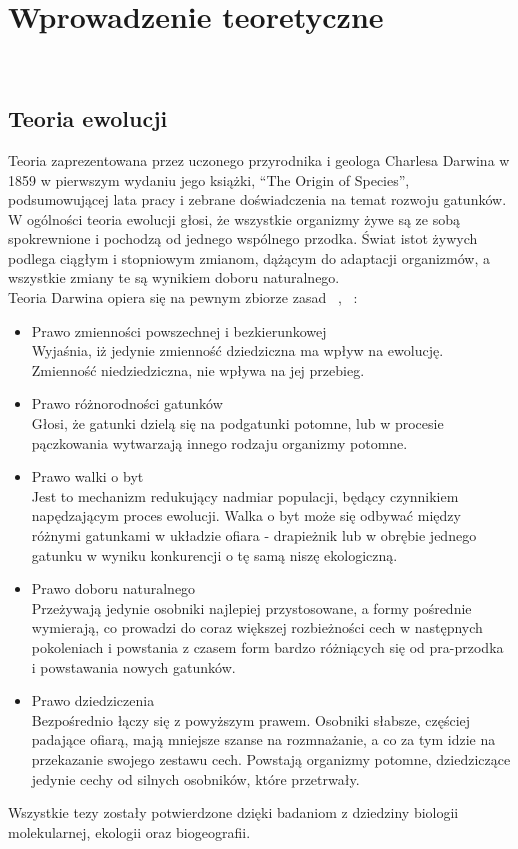 \documentclass[twoside,a4paper,10]{book}
\begin{document}
\chapter{Wprowadzenie teoretyczne} ~\label{sec:chap1} 

\section{ Teoria ewolucji}
Teoria zaprezentowana przez uczonego przyrodnika i geologa Charlesa Darwina w 1859 w pierwszym wydaniu jego książki, “The Origin of Species”,  podsumowującej lata pracy i zebrane doświadczenia na temat rozwoju gatunków. 
W ogólności teoria ewolucji głosi, że wszystkie organizmy żywe są ze sobą spokrewnione i pochodzą od jednego wspólnego przodka. Świat istot żywych podlega ciągłym i stopniowym zmianom, dążącym do adaptacji organizmów, a wszystkie zmiany te są wynikiem doboru naturalnego.   ~\cite{darwin}
\\Teoria Darwina opiera się na pewnym zbiorze zasad  ~\cite{darwin},  ~\cite{darwinWeb}: 
\begin{itemize}
\item{   Prawo zmienności powszechnej i bezkierunkowej}\\
Wyjaśnia, iż jedynie zmienność dziedziczna ma wpływ na ewolucję. Zmienność niedziedziczna, nie wpływa na jej przebieg.
\item{  Prawo różnorodności gatunków}\\ Głosi, że gatunki dzielą się na podgatunki potomne, lub w procesie pączkowania wytwarzają innego rodzaju organizmy potomne.
\item{   Prawo walki o byt}\\ Jest to mechanizm redukujący nadmiar populacji, będący czynnikiem napędzającym proces ewolucji.  Walka o byt może się odbywać między różnymi gatunkami w układzie ofiara - drapieżnik lub w obrębie jednego gatunku w wyniku konkurencji o tę samą niszę ekologiczną. 
\item{    Prawo doboru naturalnego}
\\ Przeżywają  jedynie osobniki najlepiej przystosowane, a formy pośrednie wymierają, co prowadzi do coraz większej rozbieżności cech w następnych pokoleniach i powstania z czasem form bardzo różniących się od pra-przodka i powstawania nowych gatunków.
\item{   Prawo dziedziczenia}
\\ Bezpośrednio łączy się z powyższym prawem. Osobniki słabsze, częściej padające ofiarą, mają mniejsze szanse na rozmnażanie, a co za tym idzie na przekazanie swojego zestawu cech. Powstają organizmy potomne, dziedziczące jedynie cechy od silnych osobników, które przetrwały. 
\end{itemize}
Wszystkie tezy zostały potwierdzone dzięki badaniom z dziedziny biologii molekularnej, ekologii oraz biogeografii. 
\end{document}
